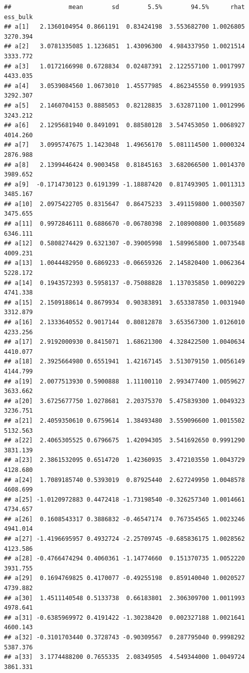 \documentclass[
]{article}
\begin{document}
\begin{verbatim}
##                mean        sd        5.5%        94.5%      rhat ess_bulk
## a[1]   2.1360104954 0.8661191  0.83424198  3.553682700 1.0026805 3270.394
## a[2]   3.0781335085 1.1236851  1.43096300  4.984337950 1.0021514 3333.772
## a[3]   1.0172166998 0.6728834  0.02487391  2.122557100 1.0017997 4433.035
## a[4]   3.0539084560 1.0673010  1.45577985  4.862345550 0.9991935 3292.307
## a[5]   2.1460704153 0.8885053  0.82128835  3.632871100 1.0012996 3243.212
## a[6]   2.1295681940 0.8491091  0.88580128  3.547453050 1.0068927 4014.260
## a[7]   3.0995747675 1.1423048  1.49656170  5.081114500 1.0000324 2876.988
## a[8]   2.1399446424 0.9003458  0.81845163  3.682066500 1.0014370 3989.652
## a[9]  -0.1714730123 0.6191399 -1.18887420  0.817493905 1.0011313 3485.167
## a[10]  2.0975422705 0.8315647  0.86475233  3.491159800 1.0003507 3475.655
## a[11]  0.9972846111 0.6886670 -0.06780398  2.108900800 1.0035689 6346.111
## a[12]  0.5808274429 0.6321307 -0.39005998  1.589965800 1.0073548 4009.231
## a[13]  1.0044482950 0.6869233 -0.06659326  2.145820400 1.0062364 5228.172
## a[14]  0.1943572393 0.5958137 -0.75088828  1.137035850 1.0090229 4741.338
## a[15]  2.1509188614 0.8679934  0.90383891  3.653387850 1.0031940 3312.879
## a[16]  2.1333640552 0.9017144  0.80812878  3.653567300 1.0126010 4233.256
## a[17]  2.9192000930 0.8415071  1.68621300  4.328422500 1.0040634 4410.077
## a[18]  2.3925664980 0.6551941  1.42167145  3.513079150 1.0056149 4144.799
## a[19]  2.0077513930 0.5900888  1.11100110  2.993477400 1.0059627 3633.662
## a[20]  3.6725677750 1.0278681  2.20375370  5.475839300 1.0049323 3236.751
## a[21]  2.4059350610 0.6759614  1.38493480  3.559096600 1.0015502 5132.563
## a[22]  2.4065305525 0.6796675  1.42094305  3.541692650 0.9991290 3831.139
## a[23]  2.3861532095 0.6514720  1.42360935  3.472103550 1.0043729 4128.680
## a[24]  1.7089185740 0.5393019  0.87925440  2.627249950 1.0048578 4608.699
## a[25] -1.0120972883 0.4472418 -1.73198540 -0.326257340 1.0014661 4734.657
## a[26]  0.1608543317 0.3886832 -0.46547174  0.767354565 1.0023246 4941.014
## a[27] -1.4196695957 0.4932724 -2.25709745 -0.685836175 1.0028562 4123.586
## a[28] -0.4766474294 0.4060361 -1.14774660  0.151370735 1.0052220 3931.755
## a[29]  0.1694769825 0.4170077 -0.49255198  0.859140040 1.0020527 4739.882
## a[30]  1.4511140548 0.5133738  0.66183801  2.306309700 1.0011993 4978.641
## a[31] -0.6385969972 0.4191422 -1.30238420  0.002327188 1.0021641 4600.143
## a[32] -0.3101703440 0.3728743 -0.90309567  0.287795040 0.9998292 5387.376
## a[33]  3.1774488200 0.7655335  2.08349505  4.549344000 1.0049724 3861.331

\end{verbatim}
\end{document}
